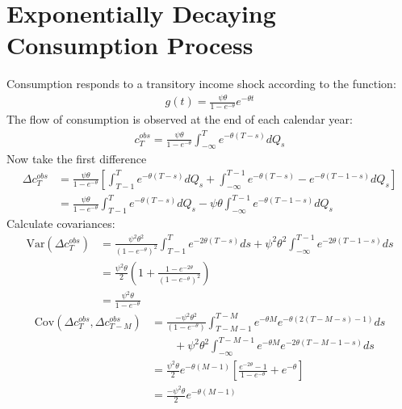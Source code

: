 \documentclass[12pt,pdftex,letterpaper]{article}
\begin{document}
\section{Exponentially Decaying Consumption Process}
Consumption responds to a transitory income shock according to the function:
\begin{align*}
g(t) = \frac{\psi \theta}{1-e^{-\theta}} e^{-\theta t}
\end{align*}
The flow of consumption is observed at the end of each calendar year:
\begin{align*}
c_T^{obs} = \frac{\psi \theta}{1-e^{-\theta}} \int_{-\infty}^{T} e^{-\theta (T-s)}dQ_s
\end{align*}
Now take the first difference
\begin{align*}
\Delta c_T^{obs} &= \frac{ \psi\theta}{1-e^{-\theta}} \left[ \int_{T-1}^{T} e^{-\theta (T-s)}dQ_s +  \int_{-\infty}^{T-1} e^{-\theta (T-s)} - e^{-\theta (T-1-s)}dQ_s \right] \\
&= \frac{ \psi \theta}{1-e^{-\theta}}  \int_{T-1}^{T} e^{-\theta (T-s)}dQ_s - \psi \theta \int_{-\infty}^{T-1} e^{-\theta (T-1-s)} dQ_s
\end{align*}
Calculate covariances:
\begin{align*}
\mathrm{Var}(\Delta c_T^{obs}) &= \frac{ \psi^2\theta^2}{(1-e^{-\theta})^2}  \int_{T-1}^{T} e^{-2\theta (T-s)}ds + \psi^2\theta^2 \int_{-\infty}^{T-1} e^{-2\theta (T-1-s)} ds \\
&= \frac{ \psi^2\theta}{2} \left(1+ \frac{ 1-e^{-2\theta}}{(1-e^{-\theta})^2} \right)\\
&= \frac{ \psi^2\theta}{1-e^{-\theta}}
\end{align*}
\begin{align*}
\mathrm{Cov}(\Delta c_T^{obs},\Delta c_{T-M}^{obs}) &= \frac{ -\psi^2\theta^2}{(1-e^{-\theta})}  \int_{T-M-1}^{T-M} e^{-\theta M}e^{-\theta (2(T-M-s)-1) }ds \\
& \qquad + \psi^2\theta^2 \int_{-\infty}^{T-M-1} e^{-\theta M} e^{-2\theta (T-M-1-s)} ds \\
&= \frac{\psi^2\theta}{2} e^{-\theta (M-1)} \left[ \frac{ e^{-2\theta}-1 }{1-e^{-\theta} }   + e^{-\theta}  \right] \\
&= \frac{-\psi^2\theta}{2} e^{-\theta (M-1)} 
\end{align*}
\end{document}
